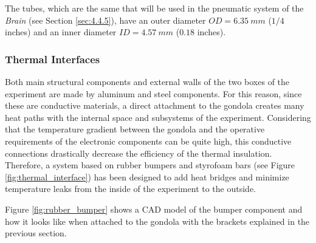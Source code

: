\documentclass[a4paper,12pt,twoside]{article}
\begin{document}
The tubes, which are the same that will be used in the pneumatic system of the \emph{Brain} (see Section \ref{sec:4.4.5}), have an outer diameter $OD = 6.35\ mm$ ($1/4$ inches) and an inner diameter $ID = 4.57\ mm$ ($0.18$ inches).

\subsubsection{Thermal Interfaces}
\label{sec:4.2.2}

Both main structural components and external walls of the two boxes of the experiment are made by aluminum and steel components. For this reason, since these are conductive materials, a direct attachment to the gondola creates many heat paths with the internal space and subsystems of the experiment. Considering that the temperature gradient between the gondola and the operative requirements of the electronic components can be quite high, this conductive connections drastically decrease the efficiency of the thermal insulation. Therefore, a system based on rubber bumpers and styrofoam bars (see Figure \ref{fig:thermal_interface}) has been designed to add heat bridges and minimize temperature leaks from the inside of the experiment to the outside.

Figure \ref{fig:rubber_bumper} shows a CAD model of the bumper component and how it looks like when attached to the gondola with the brackets explained in the previous section.
\end{document}
